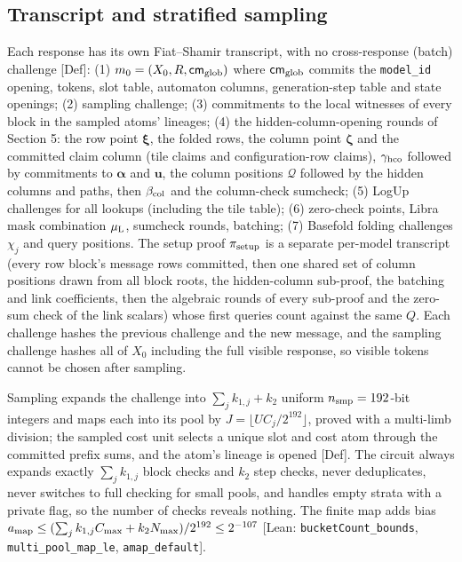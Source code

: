 \documentclass[10pt]{article}
\begin{document}
\subsection{Transcript and stratified sampling}
Each response has its own Fiat--Shamir transcript, with no cross-response (batch) challenge [Def]: (1) $m_0=(X_0,R,\mathsf{cm}_{\rm glob})$ where $\mathsf{cm}_{\rm glob}$ commits the \texttt{model\_\allowbreak{}id} opening, tokens, slot table, automaton columns, generation-step table and state openings; (2) sampling challenge; (3) commitments to the local witnesses of every block in the sampled atoms' lineages; (4) the hidden-column-opening rounds of Section 5: the row point $\boldsymbol\xi$, the folded rows, the column point $\boldsymbol\zeta$ and the committed claim column (tile claims and configuration-row claims), $\gamma_{\rm hco}$ followed by commitments to $\boldsymbol\alpha$ and $\mathbf u$, the column positions $\mathcal Q$ followed by the hidden columns and paths, then $\beta_{\rm col}$ and the column-check sumcheck; (5) LogUp challenges for all lookups (including the tile table); (6) zero-check points, Libra mask combination $\mu_{\rm L}$, sumcheck rounds, batching; (7) Basefold folding challenges $\chi_j$ and query positions. The setup proof $\pi_{\rm setup}$ is a separate per-model transcript (every row block's message rows committed, then one shared set of column positions drawn from all block roots, the hidden-column sub-proof, the batching and link coefficients, then the algebraic rounds of every sub-proof and the zero-sum check of the link scalars) whose first queries count against the same $Q$. Each challenge hashes the previous challenge and the new message, and the sampling challenge hashes all of $X_0$ including the full visible response, so visible tokens cannot be chosen after sampling.

Sampling expands the challenge into $\sum_jk_{1,j}+k_2$ uniform $n_{\rm smp}=192$-bit integers and maps each into its pool by $J=\lfloor UC_j/2^{192}\rfloor$, proved with a multi-limb division; the sampled cost unit selects a unique slot and cost atom through the committed prefix sums, and the atom's lineage is opened [Def]. The circuit always expands exactly $\sum_jk_{1,j}$ block checks and $k_2$ step checks, never deduplicates, never switches to full checking for small pools, and handles empty strata with a private flag, so the number of checks reveals nothing. The finite map adds bias $a_{\rm map}\le(\sum_jk_{1,j}C_{\max}+k_2N_{\max})/2^{192}\le2^{-107}$ [Lean: \texttt{bucketCount\_\allowbreak{}bounds}, \texttt{multi\_\allowbreak{}pool\_\allowbreak{}map\_\allowbreak{}le}, \texttt{amap\_\allowbreak{}default}].
\end{document}
